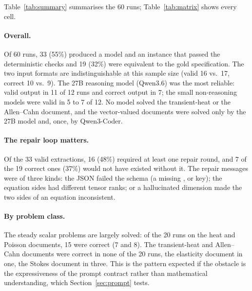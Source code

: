 Table~\ref{tab:summary} summarises the 60 runs; Table~\ref{tab:matrix} shows every cell.

\begin{table}[t]
\centering\small
\caption{Extraction benchmark with the original prompt: number of documents (out of 6) per model and input format that were \emph{valid} (accepted by the deterministic checks), \emph{correct} (equivalent to gold), \emph{ran} (the generated solver compiled and ran) and \emph{exact} (solver output identical to the gold solver's).}
\label{tab:summary}

\end{table}

\begin{table}[t]
\centering\small
\caption{Outcome of every run with the original prompt (H = HTML/MathML, P = PDF text). \cmark: correct (equivalent to gold); $\sim$: accepted by the validators but not equivalent to the paper; \xmark: rejected at the trust boundary (no valid model/instance).}
\label{tab:matrix}

\end{table}

\paragraph{Overall.} Of 60 runs, 33 (55\%) produced a model and an instance that passed the deterministic checks and 19 (32\%) were equivalent to the gold specification. The two input formats are indistinguishable at this sample size (valid 16 vs.\ 17, correct 10 vs.\ 9). The 27B reasoning model (Qwen3.6) was the most reliable: valid output in 11 of 12 runs and correct output in 7; the small non-reasoning models were valid in 5 to 7 of 12. No model solved the transient-heat or the Allen--Cahn document, and the vector-valued documents were solved only by the 27B model and, once, by Qwen3-Coder.

\paragraph{The repair loop matters.} Of the 33 valid extractions, 16 (48\%) required at least one repair round, and 7 of the 19 correct ones (37\%) would not have existed without it. The repair messages were of three kinds: the JSON failed the schema (a missing ,  or  key); the equation sides had different tensor ranks; or a hallucinated dimension made the two sides of an equation inconsistent.

\paragraph{By problem class.} The steady scalar problems are largely solved: of the 20 runs on the heat and Poisson documents, 15 were correct (7 and 8). The transient-heat and Allen--Cahn documents were correct in none of the 20 runs, the elasticity document in one, the Stokes document in three. This is the pattern expected if the obstacle is the expressiveness of the prompt contract rather than mathematical understanding, which Section~\ref{sec:prompt} tests.

